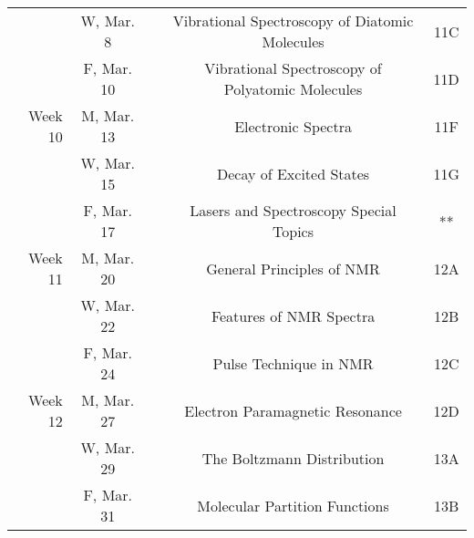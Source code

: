 \documentclass[12pt, letterpaper]{article}
\begin{document}
\begin{tabular}{rcccc}
	        & W, Mar. 8  &                                                           & Vibrational Spectroscopy of Diatomic Molecules   & 11C     \\
	        & F, Mar. 10 &                                                           & Vibrational Spectroscopy of Polyatomic Molecules & 11D     \\
	\midrule
	Week 10 & M, Mar. 13 &                                                           & Electronic Spectra                               & 11F     \\
	        & W, Mar. 15 &                                                           & Decay of Excited States                          & 11G     \\
	        & F, Mar. 17 &                                                           & Lasers and Spectroscopy Special Topics           & **      \\
	\midrule
	Week 11 & M, Mar. 20 &                                                           & General Principles of NMR                        & 12A     \\
	        & W, Mar. 22 &                                                           & Features of NMR Spectra                          & 12B     \\
	        & F, Mar. 24 &                                                           & Pulse Technique in NMR                           & 12C     \\
	\midrule
	Week 12 & M, Mar. 27 &                                                           & Electron Paramagnetic Resonance                  & 12D     \\
	        & W, Mar. 29 &                                                           & The Boltzmann Distribution                       & 13A     \\
	        & F, Mar. 31 &                                                           & Molecular Partition Functions                    & 13B     \\
\end{tabular}
\end{document}
